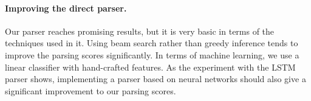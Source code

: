 \documentclass[11pt]{article}
\begin{document}
\paragraph{Improving the direct parser.}
Our parser reaches promising results, but it is very basic in terms of the techniques used in it. Using beam search rather than greedy inference tends to improve the parsing scores significantly.
In terms of machine learning, we use a linear classifier with hand-crafted features. As the experiment with the LSTM parser shows, implementing a parser based on neural networks should also give a significant improvement to our parsing scores.



\end{document}
